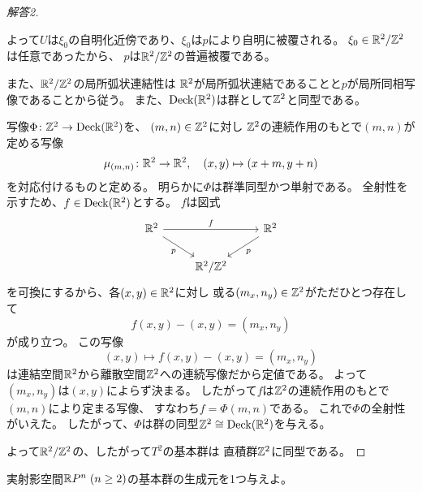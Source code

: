 \documentclass[report]{jlreq}
\begin{document}
\begin{proof}[解答2]
\begin{innerproof}
        よって$U$は$\xi_0$の自明化近傍であり、$\xi_0$は$p$により自明に被覆される。
        $\xi_0 \in \mathbb{R}^2 / \mathbb{Z}^2$は任意であったから、
        $p$は$\mathbb{R}^2 / \mathbb{Z}^2$の普遍被覆である。
    \end{innerproof}
    また、$\mathbb{R}^2 / \mathbb{Z}^2$の局所弧状連結性は
    $\mathbb{R}^2$が局所弧状連結であることと$p$が局所同相写像であることから従う。
    また、$\operatorname{Deck}(\mathbb{R}^2)$は群として$\mathbb{Z}^2$と同型である。
    \begin{innerproof}
        写像$\Phi \colon \mathbb{Z}^2 \to \operatorname{Deck}(\mathbb{R}^2)$を、
        $(m, n) \in \mathbb{Z}^2$に対し
        $\mathbb{Z}^2$の連続作用のもとで$(m, n)$が定める写像
        \begin{equation}
            \mu_{(m, n)} \colon \mathbb{R}^2 \to \mathbb{R}^2,
            \quad
            (x, y) \mapsto (x + m, y + n)
        \end{equation}
        を対応付けるものと定める。
        明らかに$\Phi$は群準同型かつ単射である。
        全射性を示すため、$f \in \operatorname{Deck}(\mathbb{R}^2)$とする。
        $f$は図式
        \begin{equation}
            \begin{tikzcd}
                \R^2 \ar{rd}[swap]{p} \ar{rr}{f} && \R^2 \ar{ld}{p} \\
                & \R^2 / \Z^2
            \end{tikzcd}
        \end{equation}
        を可換にするから、各$(x, y) \in \mathbb{R}^2$に対し
        或る$(m_x, n_y) \in \mathbb{Z}^2$がただひとつ存在して
        \begin{equation}
            f(x, y) - (x, y) = (m_x, n_y)
        \end{equation}
        が成り立つ。
        この写像
        \begin{equation}
            (x, y) \mapsto f(x, y) - (x, y) = (m_x, n_y)
        \end{equation}
        は連結空間$\mathbb{R}^2$から離散空間$\mathbb{Z}^2$への連続写像だから定値である。
        よって$(m_x, n_y)$は$(x, y)$によらず決まる。
        したがって$f$は$\mathbb{Z}^2$の連続作用のもとで$(m, n)$により定まる写像、
        すなわち$f = \Phi(m, n)$である。
        これで$\Phi$の全射性がいえた。
        したがって、$\Phi$は群の同型$\mathbb{Z}^2 \cong \operatorname{Deck}(\mathbb{R}^2)$を与える。
    \end{innerproof}
    よって$\mathbb{R}^2 / \mathbb{Z}^2$の、したがって$T^2$の基本群は
    直積群$\mathbb{Z}^2$に同型である。
\end{proof}

\begin{problem}[幾何学II 4.3]
    実射影空間$\mathbb{R} P^n \; (n \ge 2)$の基本群の生成元を1つ与えよ。
\end{problem}
\end{document}
